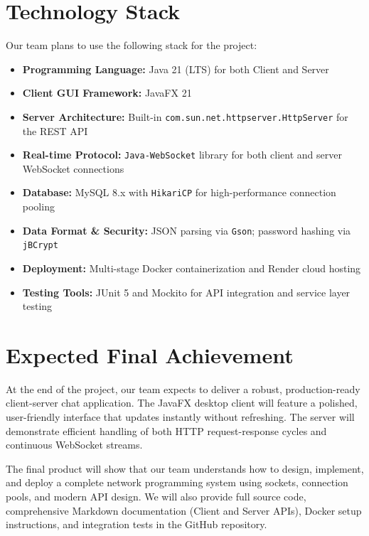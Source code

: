 \documentclass[11pt]{article}
\begin{document}
\section{Technology Stack}

Our team plans to use the following stack for the project:

\begin{itemize}
    \item \textbf{Programming Language:} Java 21 (LTS) for both Client and Server
    \item \textbf{Client GUI Framework:} JavaFX 21
    \item \textbf{Server Architecture:} Built-in \texttt{com.sun.net.httpserver.HttpServer} for the REST API
    \item \textbf{Real-time Protocol:} \texttt{Java-WebSocket} library for both client and server WebSocket connections
    \item \textbf{Database:} MySQL 8.x with \texttt{HikariCP} for high-performance connection pooling
    \item \textbf{Data Format \& Security:} JSON parsing via \texttt{Gson}; password hashing via \texttt{jBCrypt}
    \item \textbf{Deployment:} Multi-stage Docker containerization and Render cloud hosting
    \item \textbf{Testing Tools:} JUnit 5 and Mockito for API integration and service layer testing
\end{itemize}

\section{Expected Final Achievement}

At the end of the project, our team expects to deliver a robust, production-ready client-server chat application. The JavaFX desktop client will feature a polished, user-friendly interface that updates instantly without refreshing. The server will demonstrate efficient handling of both HTTP request-response cycles and continuous WebSocket streams. 

The final product will show that our team understands how to design, implement, and deploy a complete network programming system using sockets, connection pools, and modern API design. We will also provide full source code, comprehensive Markdown documentation (Client and Server APIs), Docker setup instructions, and integration tests in the GitHub repository.
\end{document}
